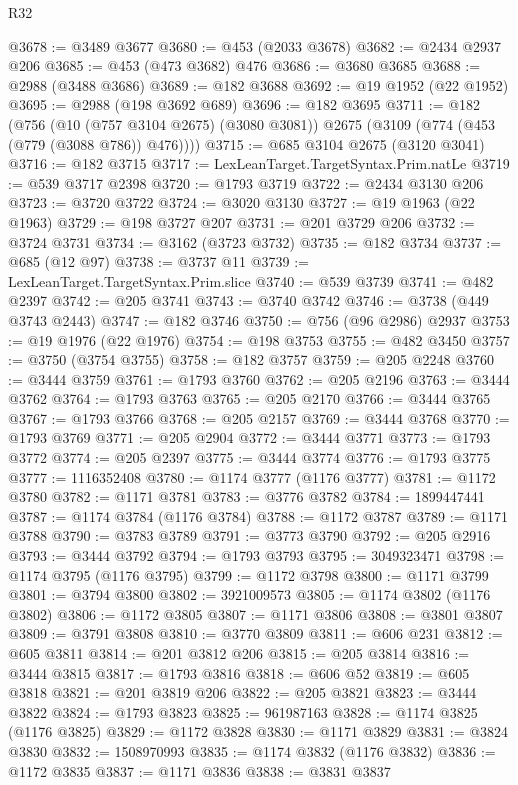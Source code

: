 \begin{lexlean}{R32}
\begin{coremodule}
@3678 := @3489 @3677
@3680 := @453 (@2033 @3678)
@3682 := @2434 @2937 @206
@3685 := @453 (@473 @3682) @476
@3686 := @3680 @3685
@3688 := @2988 (@3488 @3686)
@3689 := @182 @3688
@3692 := @19 @1952 (@22 @1952)
@3695 := @2988 (@198 @3692 @689)
@3696 := @182 @3695
@3711 := @182
    (@756
      (@10 (@757 @3104 @2675) (@3080 @3081))
      @2675
      (@3109 (@774 (@453 (@779 (@3088 @786)) @476))))
@3715 := @685 @3104 @2675 (@3120 @3041)
@3716 := @182 @3715
@3717 := LexLeanTarget.TargetSyntax.Prim.natLe
@3719 := @539 @3717 @2398
@3720 := @1793 @3719
@3722 := @2434 @3130 @206
@3723 := @3720 @3722
@3724 := @3020 @3130
@3727 := @19 @1963 (@22 @1963)
@3729 := @198 @3727 @207
@3731 := @201 @3729 @206
@3732 := @3724 @3731
@3734 := @3162 (@3723 @3732)
@3735 := @182 @3734
@3737 := @685 (@12 @97)
@3738 := @3737 @11
@3739 := LexLeanTarget.TargetSyntax.Prim.slice
@3740 := @539 @3739
@3741 := @482 @2397
@3742 := @205 @3741
@3743 := @3740 @3742
@3746 := @3738 (@449 @3743 @2443)
@3747 := @182 @3746
@3750 := @756 (@96 @2986) @2937
@3753 := @19 @1976 (@22 @1976)
@3754 := @198 @3753
@3755 := @482 @3450
@3757 := @3750 (@3754 @3755)
@3758 := @182 @3757
@3759 := @205 @2248
@3760 := @3444 @3759
@3761 := @1793 @3760
@3762 := @205 @2196
@3763 := @3444 @3762
@3764 := @1793 @3763
@3765 := @205 @2170
@3766 := @3444 @3765
@3767 := @1793 @3766
@3768 := @205 @2157
@3769 := @3444 @3768
@3770 := @1793 @3769
@3771 := @205 @2904
@3772 := @3444 @3771
@3773 := @1793 @3772
@3774 := @205 @2397
@3775 := @3444 @3774
@3776 := @1793 @3775
@3777 := 1116352408
@3780 := @1174 @3777 (@1176 @3777)
@3781 := @1172 @3780
@3782 := @1171 @3781
@3783 := @3776 @3782
@3784 := 1899447441
@3787 := @1174 @3784 (@1176 @3784)
@3788 := @1172 @3787
@3789 := @1171 @3788
@3790 := @3783 @3789
@3791 := @3773 @3790
@3792 := @205 @2916
@3793 := @3444 @3792
@3794 := @1793 @3793
@3795 := 3049323471
@3798 := @1174 @3795 (@1176 @3795)
@3799 := @1172 @3798
@3800 := @1171 @3799
@3801 := @3794 @3800
@3802 := 3921009573
@3805 := @1174 @3802 (@1176 @3802)
@3806 := @1172 @3805
@3807 := @1171 @3806
@3808 := @3801 @3807
@3809 := @3791 @3808
@3810 := @3770 @3809
@3811 := @606 @231
@3812 := @605 @3811
@3814 := @201 @3812 @206
@3815 := @205 @3814
@3816 := @3444 @3815
@3817 := @1793 @3816
@3818 := @606 @52
@3819 := @605 @3818
@3821 := @201 @3819 @206
@3822 := @205 @3821
@3823 := @3444 @3822
@3824 := @1793 @3823
@3825 := 961987163
@3828 := @1174 @3825 (@1176 @3825)
@3829 := @1172 @3828
@3830 := @1171 @3829
@3831 := @3824 @3830
@3832 := 1508970993
@3835 := @1174 @3832 (@1176 @3832)
@3836 := @1172 @3835
@3837 := @1171 @3836
@3838 := @3831 @3837

\end{coremodule}
\end{lexlean}

